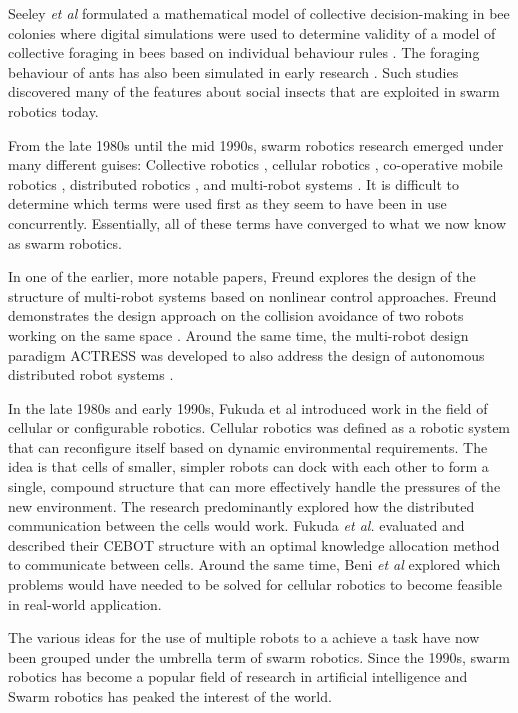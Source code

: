 Seeley \textit{et al }\cite{seeley1991collective} formulated a mathematical model of collective decision-making in bee colonies where digital simulations were used to determine validity of a model of collective foraging in bees based on individual behaviour rules \cite{de1998modelling}. The foraging behaviour of ants has also been simulated in early research \cite{lopez1987optimal}. Such studies discovered many of the features about social insects that are exploited in swarm robotics today.

From the late 1980s until the mid 1990s, swarm robotics research emerged under many different guises: Collective robotics \cite{kube1993collective}, cellular robotics \cite{freund1984design}, co-operative mobile robotics \cite{cao1997cooperative}, distributed robotics \cite{asama2013distributed}, and multi-robot systems \cite{mataric1995cooperative}. It is difficult to determine which terms were used first as they seem to have been in use concurrently. Essentially, all of these terms have converged to what we now know as swarm robotics.

In one of the earlier, more notable papers, Freund explores the design of the structure of multi-robot systems based on nonlinear control approaches. Freund demonstrates the design approach on the collision avoidance of two robots working on the same space \cite{freund1984design,freund1986pathfinding}. Around the same time, the multi-robot design paradigm ACTRESS was developed to also address the design of autonomous distributed robot systems \cite{asama1989design}. 

In the late 1980s and early 1990s, Fukuda et al \cite{fukuda1989communication, fukuda1990analysis} introduced work in the field of cellular or configurable robotics. Cellular robotics was defined as a robotic system that can reconfigure itself based on dynamic environmental requirements. The idea is that cells of smaller, simpler robots can dock with each other to form a single, compound structure that can more effectively handle the pressures of the new environment. The research predominantly explored how the distributed communication between the cells would work. Fukuda \textit{et al.} evaluated and described their CEBOT structure with an optimal knowledge allocation method to communicate between cells. Around the same time, Beni \textit{et al} \cite{beni1991theoretical} explored which problems would have needed to be solved for cellular robotics to become feasible in real-world application.

The various ideas for the use of multiple robots to a achieve a task have now been grouped under the umbrella term of swarm robotics. Since the 1990s, swarm robotics has become a popular field of research in artificial intelligence and Swarm robotics has peaked the interest of the world. 


